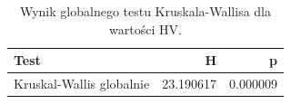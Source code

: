 \begin{table}
\caption{Wynik globalnego testu Kruskala-Wallisa dla wartości HV.}
\label{tab:kruskal_global}
\begin{tabular}{lrr}
\toprule
Test & H & p \\
\midrule
Kruskal-Wallis globalnie & 23.190617 & 0.000009 \\
\bottomrule
\end{tabular}
\end{table}
